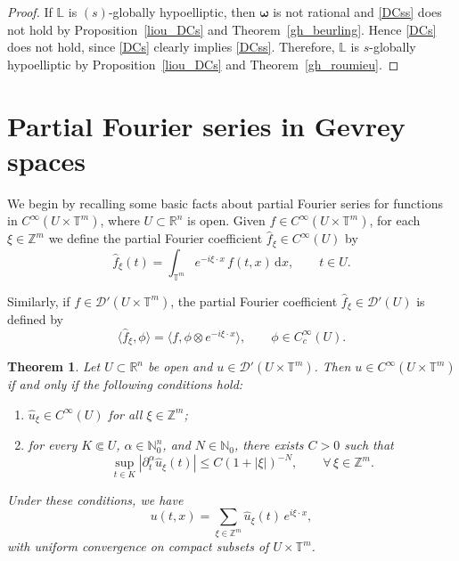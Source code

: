 \documentclass[11pt,reqno]{amsart}
\numberwithin{equation}{section}
\newtheorem{theorem}{Theorem}[section]
\begin{document}
	\begin{proof}
		If \(\mathbb{L}\) is \((s)\)-globally hypoelliptic, then \(\boldsymbol{\omega}\) is not rational and \eqref{DCss} does not hold by Proposition~\ref{liou_DCs} and Theorem~\ref{gh_beurling}.
		Hence \eqref{DCs} does not hold, since \eqref{DCs} clearly implies \eqref{DCss}.
		Therefore, \(\mathbb{L}\) is \(s\)-globally hypoelliptic by Proposition~\ref{liou_DCs} and Theorem~\ref{gh_roumieu}.
	\end{proof}
	


	\appendix\section{Partial Fourier series in Gevrey spaces}\label{appendix}
	
	We begin by recalling some basic facts about partial Fourier series for functions in \(C^\infty(U\times\mathbb{T}^m)\), where \(U\subset\mathbb{R}^n\) is open.
	Given \(f \in C^\infty(U \times \mathbb{T}^m)\), for each \(\xi \in \mathbb{Z}^m\) we define the partial Fourier coefficient \(\widehat{f}_\xi \in C^\infty(U)\) by
	\[
	\widehat{f}_\xi(t) = \int_{\mathbb{T}^m} e^{-i \xi\cdot x}\, f(t, x)\, \mathrm{d}x, \qquad t\in U.
	\]
	
	Similarly, if \(f \in \mathscr{D}'(U \times \mathbb{T}^m)\), the partial Fourier coefficient \(\widehat{f}_\xi \in \mathscr{D}'(U)\) is defined by
	\[
	\langle \widehat{f}_\xi, \phi \rangle = \langle f, \phi \otimes e^{-i\xi\cdot x} \rangle,
	\qquad \phi \in C_c^\infty(U).
	\]
	
	\begin{theorem}
		Let \(U \subset \mathbb{R}^n\) be open and \(u \in \mathscr{D}'(U \times \mathbb{T}^m)\).
		Then \(u \in C^\infty(U \times \mathbb{T}^m)\) if and only if the following conditions hold:
		\begin{enumerate}
			\item \(\widehat{u}_\xi \in C^\infty(U)\) for all \(\xi \in \mathbb{Z}^m\);
			
			\item for every \(K \Subset U\), \(\alpha \in \mathbb{N}_0^n\), and \(N \in \mathbb{N}_0\), there exists \(C > 0\) such that
			\[
			\sup_{t \in K} |\partial_t^\alpha \widehat{u}_\xi(t)|
			\leq C (1 + |\xi|)^{-N},
			\qquad \forall\, \xi \in \mathbb{Z}^m.
			\]
		\end{enumerate}
		
		Under these conditions, we have
		\[
		u(t, x) = \sum_{\xi \in \mathbb{Z}^m} \widehat{u}_\xi(t)\, e^{i\xi\cdot x},
		\]
		with uniform convergence on compact subsets of \(U \times \mathbb{T}^m\).
	\end{theorem}
	
\end{document}
